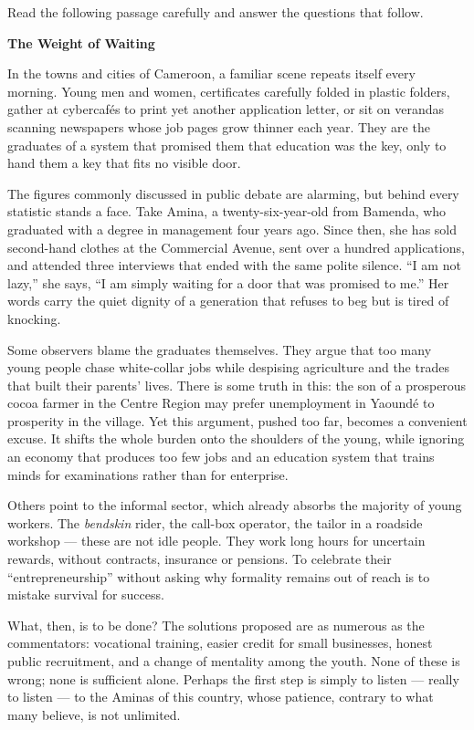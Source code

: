 \documentclass[11pt]{article}
\begin{document}
\begin{exercice}
Read the following passage carefully and answer the questions that follow.

\textbf{The Weight of Waiting}

In the towns and cities of Cameroon, a familiar scene repeats itself every morning. Young men and women, certificates carefully folded in plastic folders, gather at cybercafés to print yet another application letter, or sit on verandas scanning newspapers whose job pages grow thinner each year. They are the graduates of a system that promised them that education was the key, only to hand them a key that fits no visible door.

The figures commonly discussed in public debate are alarming, but behind every statistic stands a face. Take Amina, a twenty-six-year-old from Bamenda, who graduated with a degree in management four years ago. Since then, she has sold second-hand clothes at the Commercial Avenue, sent over a hundred applications, and attended three interviews that ended with the same polite silence. ``I am not lazy,'' she says, ``I am simply waiting for a door that was promised to me.'' Her words carry the quiet dignity of a generation that refuses to beg but is tired of knocking.

Some observers blame the graduates themselves. They argue that too many young people chase white-collar jobs while despising agriculture and the trades that built their parents' lives. There is some truth in this: the son of a prosperous cocoa farmer in the Centre Region may prefer unemployment in Yaoundé to prosperity in the village. Yet this argument, pushed too far, becomes a convenient excuse. It shifts the whole burden onto the shoulders of the young, while ignoring an economy that produces too few jobs and an education system that trains minds for examinations rather than for enterprise.

Others point to the informal sector, which already absorbs the majority of young workers. The \emph{bendskin} rider, the call-box operator, the tailor in a roadside workshop — these are not idle people. They work long hours for uncertain rewards, without contracts, insurance or pensions. To celebrate their ``entrepreneurship'' without asking why formality remains out of reach is to mistake survival for success.

What, then, is to be done? The solutions proposed are as numerous as the commentators: vocational training, easier credit for small businesses, honest public recruitment, and a change of mentality among the youth. None of these is wrong; none is sufficient alone. Perhaps the first step is simply to listen — really to listen — to the Aminas of this country, whose patience, contrary to what many believe, is not unlimited.


\end{exercice}
\end{document}
